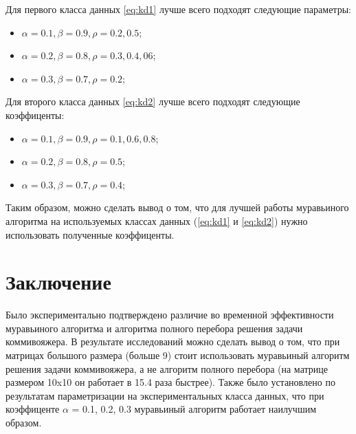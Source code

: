 \documentclass[a4paper,14pt, unknownkeysallowed]{extreport}
\begin{document}
Для первого класса данных \ref{eq:kd1} лучше всего подходят следующие параметры:
\begin{itemize}
    \item $\alpha = 0.1, \beta = 0.9, \rho = 0.2, 0.5$;
    \item $\alpha = 0.2, \beta = 0.8, \rho = 0.3, 0.4, 06$;
    \item $\alpha = 0.3, \beta = 0.7, \rho = 0.2$;
\end{itemize}  

Для второго класса данных \ref{eq:kd2} лучше всего подходят следующие коэффиценты:
\begin{itemize}
    \item $\alpha = 0.1, \beta = 0.9, \rho = 0.1, 0.6, 0.8$;
    \item $\alpha = 0.2, \beta = 0.8, \rho = 0.5$;
    \item $\alpha = 0.3, \beta = 0.7, \rho = 0.4$;
\end{itemize}  

Таким образом, можно сделать вывод о том, что для лучшей работы муравьиного алгоритма на используемых классах данных (\ref{eq:kd1} и \ref{eq:kd2}) нужно использовать полученные коэффиценты.





\chapter*{Заключение}

Было экспериментально подтверждено различие во временной эффективности муравьиного алгоритма и алгоритма полного перебора решения задачи коммивояжера. В результате исследований можно сделать вывод о том, что при матрицах большого размера (больше 9) стоит использовать муравьиный алгоритм решения задачи коммивояжера, а не алгоритм полного перебора (на матрице размером 10x10 он работает в 15.4 раза быстрее). Также было установлено по результатам параметризации на экспериментальных класса данных, что при коэффиценте $\alpha$ = 0.1, 0.2, 0.3 муравьиный алгоритм работает наилучшим образом.
\vspace{5mm}
\end{document}
